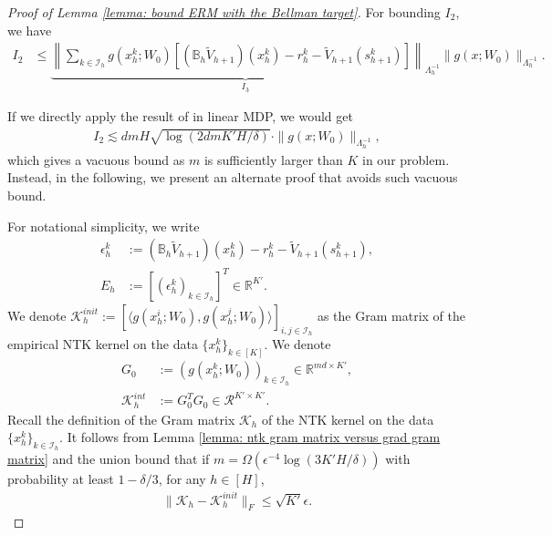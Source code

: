 \documentclass{article} \usepackage{iclr2023/iclr2023_conference,times}
\begin{document}
\begin{proof}[Proof of Lemma \ref{lemma: bound ERM with the Bellman target}]
For bounding $I_2$, we have
\begin{align}
    I_2 &\leq  \underbrace{\left\| \sum_{k \in \mathcal{I}_h} g(x^k_h; W_0) \left[ (\mathbb{B}_h \tilde{V}_{h+1})(x^k_h) - r^k_h - \tilde{V}_{h+1}(s^k_{h+1}) \right] \right\|_{\Lambda_h^{-1}} }_{I_3}  \| g(x; W_0) \|_{\Lambda_h^{-1}}.
    \label{eq: bound I2 in terms of I3}
\end{align}


If we directly apply the result of \cite{jin2021pessimism} in linear MDP, we would get
\begin{align*}
    I_2 \lesssim  dm H \sqrt{\log (2 dm K'H /\delta)} \cdot \| g(x; W_0) \|_{\Lambda_h^{-1}},
\end{align*}
which gives a vacuous bound as $m$ is sufficiently larger than $K$ in our problem. Instead, in the following, we present an alternate proof that avoids such vacuous bound. 

For notational simplicity, we write 
\begin{align*}
    \epsilon^k_h &:= (\mathbb{B}_h \tilde{V}_{h+1})(x^k_h) - r^k_h - \tilde{V}_{h+1}(s^k_{h+1}), \\ 
    E_h &:= [(\epsilon^k_h)_{k \in \mathcal{I}_h}]^T  \in \mathbb{R}^{K'}. 
\end{align*}
We denote $\mathcal{K}^{init}_h := [\langle g(x^i_h; W_0), g(x^j_h; W_0) \rangle]_{i,j \in \mathcal{I}_h}$ as the Gram matrix of the empirical NTK kernel on the data $\{x^k_h\}_{k \in [K]}$. We denote 
\begin{align*}
    G_0 &:= \left( g(x^k_h; W_0) \right)_{k \in \mathcal{I}_h} \in \mathbb{R}^{md \times K' }, \\ 
    \mathcal{K}^{int}_h &:= G_0^T G_0 \in \mathcal{R}^{K' \times K'}. 
\end{align*}
Recall the definition of the Gram matrix $\mathcal{K}_h$ of the NTK kernel on the data $\{x^k_h\}_{k \in \mathcal{I}_h}$. It follows from Lemma \ref{lemma: ntk gram matrix versus grad gram matrix} and the union bound that if $m = \Omega(\epsilon^{-4} \log(3 K'H/\delta))$ with probability at least $1 - \delta/3$, for any $h \in [H]$,
\begin{align}
    \| \mathcal{K}_h - \mathcal{K}_h^{init} \|_F \leq \sqrt{K'} \epsilon.
    \label{eq: cov ntk - cov init}
\end{align}




\end{proof}
\end{document}
